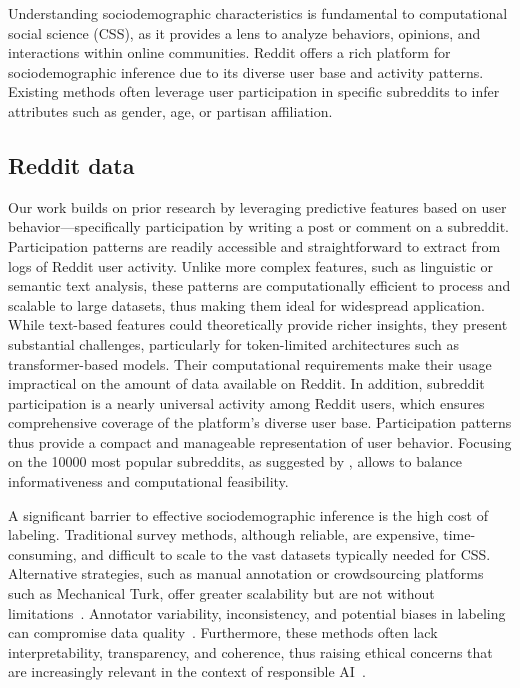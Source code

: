 Understanding sociodemographic characteristics is fundamental to computational social science (CSS), as it provides a lens to analyze behaviors, opinions, and interactions within online communities.
Reddit offers a rich platform for sociodemographic inference due to its diverse user base and activity patterns.
Existing methods often leverage user participation in specific subreddits to infer attributes such as gender, age, or partisan affiliation.




\subsection{Reddit data}

Our work builds on prior research by leveraging predictive features based on user behavior---specifically participation by writing a post or comment on a subreddit.
Participation patterns are readily accessible and straightforward to extract from logs of Reddit user activity.
Unlike more complex features, such as linguistic or semantic text analysis, these patterns are computationally efficient to process and scalable to large datasets, thus making them ideal for widespread application.
While text-based features could theoretically provide richer insights, they present substantial challenges, particularly for token-limited architectures such as transformer-based models.
Their computational requirements make their usage impractical on the amount of data available on Reddit.
In addition, subreddit participation is a nearly universal activity among Reddit users, which ensures comprehensive coverage of the platform's diverse user base.
Participation patterns thus provide a compact and manageable representation of user behavior.
Focusing on the \num{10000} most popular subreddits, as suggested by \citet{waller2021quantifying}, allows to balance informativeness and computational feasibility.

A significant barrier to effective sociodemographic inference is the high cost of labeling.
Traditional survey methods, although reliable, are expensive, time-consuming, and difficult to scale to the vast datasets typically needed for CSS.
Alternative strategies, such as manual annotation or crowdsourcing platforms~\citep{zhang2016learning} such as Mechanical Turk, offer greater scalability but are not without limitations~\citep{kittur2008crowdsourcing,stritch2017opportunities}.
Annotator variability, inconsistency, and potential biases in labeling can compromise data quality~\citep{eickhoff2018cognitive,hettiachchi2021investigating}.
Furthermore, these methods often lack interpretability, transparency, and coherence, thus raising ethical concerns that are increasingly relevant in the context of responsible AI~\citep{barbosa2019rehumanized}.

